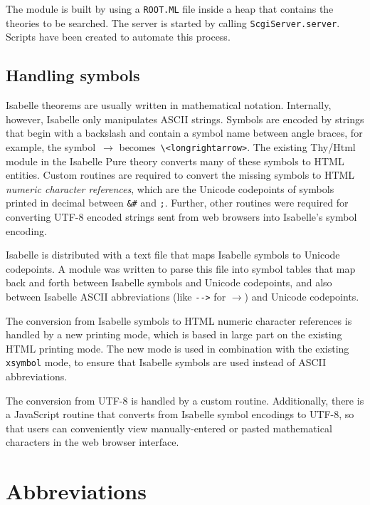 \documentclass[a4paper,draft]{article} %
\begin{document}
The module is built by using a \texttt{ROOT.ML} file inside a heap that 
contains the theories to be searched.
The server is started by calling \texttt{ScgiServer.server}.
Scripts have been created to automate this process.

\subsection{Handling symbols}\label{sec:unicode}

Isabelle theorems are usually written in mathematical notation.
Internally, however, Isabelle only manipulates \acs{ASCII} strings.
Symbols are encoded by strings that begin with a backslash and contain a 
symbol name between angle braces, for example, the symbol~$\longrightarrow$ 
becomes~\verb+\<longrightarrow>+.
The existing Thy/Html module in the Isabelle Pure theory converts many of 
these symbols to \ac{HTML} entities.
Custom routines are required to convert the missing symbols to \ac{HTML} 
\emph{numeric character references}, which are the Unicode codepoints of 
symbols printed in decimal between \verb+&#+ and \verb+;+.
Further, other routines were required for converting \acs{UTF-8} encoded 
strings sent from web browsers into Isabelle's symbol encoding.

Isabelle is distributed with a text file that maps Isabelle symbols to 
Unicode codepoints.
A module was written to parse this file into symbol tables that map back and 
forth between Isabelle symbols and Unicode codepoints, and also between 
Isabelle \acs{ASCII} abbreviations (like \verb+-->+ for $\longrightarrow$) 
and Unicode codepoints.

The conversion from Isabelle symbols to \ac{HTML} numeric character 
references is handled by a new printing mode, which is based in large part 
on the existing \ac{HTML} printing mode.
The new mode is used in combination with the existing \texttt{xsymbol} mode, 
to ensure that Isabelle symbols are used instead of \acs{ASCII} 
abbreviations.

The conversion from \acs{UTF-8} is handled by a custom routine.
Additionally, there is a JavaScript routine that converts from Isabelle 
symbol encodings to \acs{UTF-8}, so that users can conveniently view 
manually-entered or pasted mathematical characters in the web browser 
interface.

\section{Abbreviations}\label{sec:abbr}

\begin{acronym}[SML/NJ] %
\end{acronym}
\end{document}
